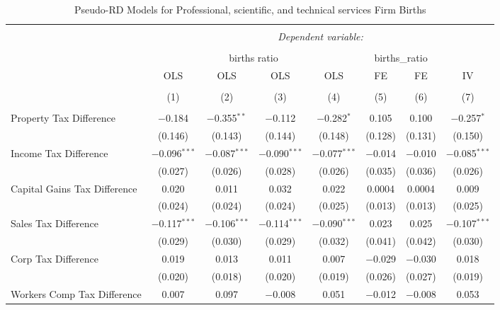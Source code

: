 
\begin{table}[!htbp] \centering 
  \caption{Pseudo-RD Models for  Professional, scientific, and technical services Firm Births} 
  \label{} 
\begin{tabular}{@{\extracolsep{5pt}}lccccccc} 
\\[-1.8ex]\hline 
\hline \\[-1.8ex] 
 & \multicolumn{7}{c}{\textit{Dependent variable:}} \\ 
\cline{2-8} 
\\[-1.8ex] & \multicolumn{4}{c}{births ratio} & \multicolumn{2}{c}{births\_ratio} &   \\ 
 & OLS & OLS & OLS & OLS & FE & FE & IV \\ 
\\[-1.8ex] & (1) & (2) & (3) & (4) & (5) & (6) & (7)\\ 
\hline \\[-1.8ex] 
 Property Tax Difference & $-$0.184 & $-$0.355$^{**}$ & $-$0.112 & $-$0.282$^{*}$ & 0.105 & 0.100 & $-$0.257$^{*}$ \\ 
  & (0.146) & (0.143) & (0.144) & (0.148) & (0.128) & (0.131) & (0.150) \\ 
  Income Tax Difference & $-$0.096$^{***}$ & $-$0.087$^{***}$ & $-$0.090$^{***}$ & $-$0.077$^{***}$ & $-$0.014 & $-$0.010 & $-$0.085$^{***}$ \\ 
  & (0.027) & (0.026) & (0.028) & (0.026) & (0.035) & (0.036) & (0.026) \\ 
  Capital Gains Tax Difference & 0.020 & 0.011 & 0.032 & 0.022 & 0.0004 & 0.0004 & 0.009 \\ 
  & (0.024) & (0.024) & (0.024) & (0.025) & (0.013) & (0.013) & (0.025) \\ 
  Sales Tax Difference & $-$0.117$^{***}$ & $-$0.106$^{***}$ & $-$0.114$^{***}$ & $-$0.090$^{***}$ & 0.023 & 0.025 & $-$0.107$^{***}$ \\ 
  & (0.029) & (0.030) & (0.029) & (0.032) & (0.041) & (0.042) & (0.030) \\ 
  Corp Tax Difference & 0.019 & 0.013 & 0.011 & 0.007 & $-$0.029 & $-$0.030 & 0.018 \\ 
  & (0.020) & (0.018) & (0.020) & (0.019) & (0.026) & (0.027) & (0.019) \\ 
  Workers Comp Tax Difference & 0.007 & 0.097 & $-$0.008 & 0.051 & $-$0.012 & $-$0.008 & 0.053 \\ 

\end{tabular}
\end{table}
